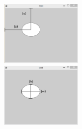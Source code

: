 \documentclass[11pt,a4paper]{jarticle}
\begin{document}
\begin{itemize}
\begin{figure}[htbp]
 \begin{minipage}{0.5\hsize}
  \begin{center}
   \includegraphics[width=40mm]{Processing_img1-6.eps}
  \end{center}
 \end{minipage}
 \begin{minipage}{0.5\hsize}
 \begin{center}
  \includegraphics[width=40mm]{Processing_img1-8.eps}
 \end{center}
 \end{minipage}
\end{figure}


\end{itemize}
\end{document}
